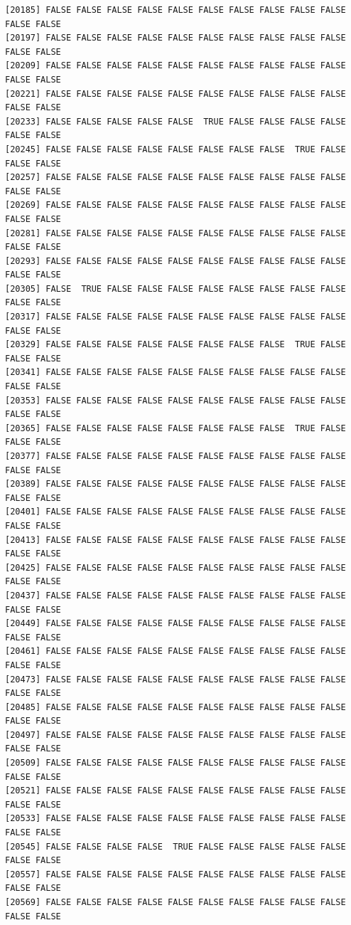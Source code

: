 \documentclass[
  a4paper,
  DIV=11,
  numbers=noendperiod]{scrartcl}
\begin{document}
\begin{verbatim}
[20185] FALSE FALSE FALSE FALSE FALSE FALSE FALSE FALSE FALSE FALSE FALSE FALSE
[20197] FALSE FALSE FALSE FALSE FALSE FALSE FALSE FALSE FALSE FALSE FALSE FALSE
[20209] FALSE FALSE FALSE FALSE FALSE FALSE FALSE FALSE FALSE FALSE FALSE FALSE
[20221] FALSE FALSE FALSE FALSE FALSE FALSE FALSE FALSE FALSE FALSE FALSE FALSE
[20233] FALSE FALSE FALSE FALSE FALSE  TRUE FALSE FALSE FALSE FALSE FALSE FALSE
[20245] FALSE FALSE FALSE FALSE FALSE FALSE FALSE FALSE  TRUE FALSE FALSE FALSE
[20257] FALSE FALSE FALSE FALSE FALSE FALSE FALSE FALSE FALSE FALSE FALSE FALSE
[20269] FALSE FALSE FALSE FALSE FALSE FALSE FALSE FALSE FALSE FALSE FALSE FALSE
[20281] FALSE FALSE FALSE FALSE FALSE FALSE FALSE FALSE FALSE FALSE FALSE FALSE
[20293] FALSE FALSE FALSE FALSE FALSE FALSE FALSE FALSE FALSE FALSE FALSE FALSE
[20305] FALSE  TRUE FALSE FALSE FALSE FALSE FALSE FALSE FALSE FALSE FALSE FALSE
[20317] FALSE FALSE FALSE FALSE FALSE FALSE FALSE FALSE FALSE FALSE FALSE FALSE
[20329] FALSE FALSE FALSE FALSE FALSE FALSE FALSE FALSE  TRUE FALSE FALSE FALSE
[20341] FALSE FALSE FALSE FALSE FALSE FALSE FALSE FALSE FALSE FALSE FALSE FALSE
[20353] FALSE FALSE FALSE FALSE FALSE FALSE FALSE FALSE FALSE FALSE FALSE FALSE
[20365] FALSE FALSE FALSE FALSE FALSE FALSE FALSE FALSE  TRUE FALSE FALSE FALSE
[20377] FALSE FALSE FALSE FALSE FALSE FALSE FALSE FALSE FALSE FALSE FALSE FALSE
[20389] FALSE FALSE FALSE FALSE FALSE FALSE FALSE FALSE FALSE FALSE FALSE FALSE
[20401] FALSE FALSE FALSE FALSE FALSE FALSE FALSE FALSE FALSE FALSE FALSE FALSE
[20413] FALSE FALSE FALSE FALSE FALSE FALSE FALSE FALSE FALSE FALSE FALSE FALSE
[20425] FALSE FALSE FALSE FALSE FALSE FALSE FALSE FALSE FALSE FALSE FALSE FALSE
[20437] FALSE FALSE FALSE FALSE FALSE FALSE FALSE FALSE FALSE FALSE FALSE FALSE
[20449] FALSE FALSE FALSE FALSE FALSE FALSE FALSE FALSE FALSE FALSE FALSE FALSE
[20461] FALSE FALSE FALSE FALSE FALSE FALSE FALSE FALSE FALSE FALSE FALSE FALSE
[20473] FALSE FALSE FALSE FALSE FALSE FALSE FALSE FALSE FALSE FALSE FALSE FALSE
[20485] FALSE FALSE FALSE FALSE FALSE FALSE FALSE FALSE FALSE FALSE FALSE FALSE
[20497] FALSE FALSE FALSE FALSE FALSE FALSE FALSE FALSE FALSE FALSE FALSE FALSE
[20509] FALSE FALSE FALSE FALSE FALSE FALSE FALSE FALSE FALSE FALSE FALSE FALSE
[20521] FALSE FALSE FALSE FALSE FALSE FALSE FALSE FALSE FALSE FALSE FALSE FALSE
[20533] FALSE FALSE FALSE FALSE FALSE FALSE FALSE FALSE FALSE FALSE FALSE FALSE
[20545] FALSE FALSE FALSE FALSE  TRUE FALSE FALSE FALSE FALSE FALSE FALSE FALSE
[20557] FALSE FALSE FALSE FALSE FALSE FALSE FALSE FALSE FALSE FALSE FALSE FALSE
[20569] FALSE FALSE FALSE FALSE FALSE FALSE FALSE FALSE FALSE FALSE FALSE FALSE

\end{verbatim}
\end{document}
